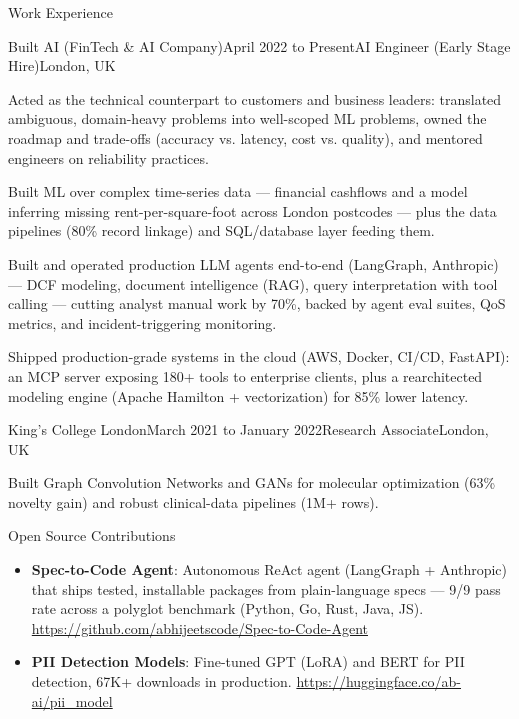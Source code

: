 \documentclass{resume} %
\begin{document}
\begin{rSection}{Work Experience}
\begin{rSubsection}{Built AI (FinTech \& AI Company)}{April 2022 to Present}{AI Engineer (Early Stage Hire)}{London, UK}
\item Acted as the technical counterpart to customers and business leaders: translated ambiguous, domain-heavy problems into well-scoped ML problems, owned the roadmap and trade-offs (accuracy vs. latency, cost vs. quality), and mentored engineers on reliability practices.
\item Built ML over complex time-series data --- financial cashflows and a model inferring missing rent-per-square-foot across London postcodes --- plus the data pipelines (80\% record linkage) and SQL/database layer feeding them.
\item Built and operated production LLM agents end-to-end (LangGraph, Anthropic) --- DCF modeling, document intelligence (RAG), query interpretation with tool calling --- cutting analyst manual work by 70\%, backed by agent eval suites, QoS metrics, and incident-triggering monitoring.
\item Shipped production-grade systems in the cloud (AWS, Docker, CI/CD, FastAPI): an MCP server exposing 180+ tools to enterprise clients, plus a rearchitected modeling engine (Apache Hamilton + vectorization) for 85\% lower latency.
\end{rSubsection}


\begin{rSubsection}{King's College London}{March 2021 to January 2022}{Research Associate}{London, UK}
\item Built Graph Convolution Networks and GANs for molecular optimization (63\% novelty gain) and robust clinical-data pipelines (1M+ rows).

\end{rSubsection}

\end{rSection}

\begin{rSection}{Open Source Contributions}
\begin{itemize}\setlength\itemsep{-0.4em}
    \item \textbf{Spec-to-Code Agent}: Autonomous ReAct agent (LangGraph + Anthropic) that ships tested, installable packages from plain-language specs --- 9/9 pass rate across a polyglot benchmark (Python, Go, Rust, Java, JS). \url{https://github.com/abhijeetscode/Spec-to-Code-Agent}
    \item \textbf{PII Detection Models}: Fine-tuned GPT (LoRA) and BERT for PII detection, 67K+ downloads in production. \url{https://huggingface.co/ab-ai/pii_model}

\end{itemize}
\end{rSection}
\end{document}
